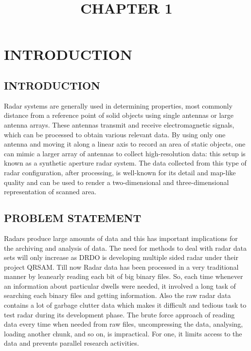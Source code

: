 \documentclass[14pt]{article} %
\date{}
\begin{document}
\tableofcontents


\title{\huge {CHAPTER 1}}
\maketitle
\section{\huge{INTRODUCTION}}


\subsection{INTRODUCTION}
         Radar systems are generally used in determining properties, most commonly distance from a reference point of solid objects using single antennas or large antenna arrays. These antennas transmit and receive electromagnetic signals, which can be processed to obtain various relevant data. By using only one antenna and moving it along a linear axis to record an area of static objects, one can mimic a larger array of antennas to collect high-resolution data: this setup is known as a synthetic aperture radar system. The data collected from this type of radar configuration, after processing, is well-known for its detail and map-like quality and can be used to render a two-dimensional and three-dimensional representation of scanned area.

\subsection{PROBLEM STATEMENT}
           Radars produce large amounts of data and this has important implications for the archiving and analysis of data. The need for methods to deal with radar data sets will only increase as DRDO is developing multiple sided radar under their project QRSAM. Till now Radar data has been processed in a very traditional manner by leanearly reading each bit of big binary files. So, each time whenever an information about particular dwells were needed, it involved a long task of searching each binary files and getting information. Also the raw radar data contains a lot of garbage clutter data which makes it difficult and tedious task to test radar during its development phase. The brute force approach of reading data every time when needed from raw files, uncompressing the data, analysing, loading another chunk, and so on, is impractical. For one, it limits access to the data and prevents parallel research activities.
\end{document}
